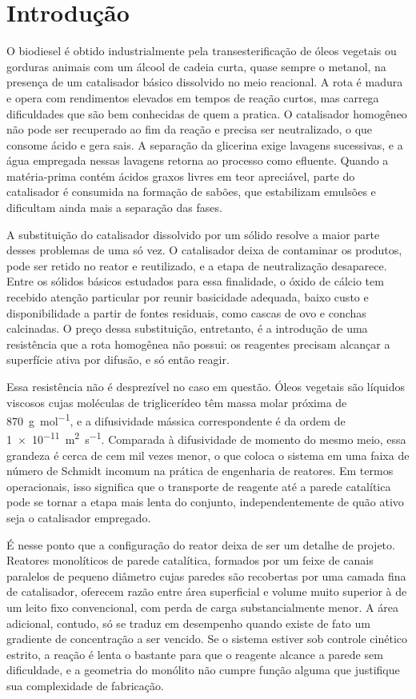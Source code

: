 \chapter*{Introdução}

O biodiesel é obtido industrialmente pela transesterificação de óleos vegetais
ou gorduras animais com um álcool de cadeia curta, quase sempre o metanol, na
presença de um catalisador básico dissolvido no meio reacional. A rota é madura
e opera com rendimentos elevados em tempos de reação curtos, mas carrega
dificuldades que são bem conhecidas de quem a pratica. O catalisador homogêneo
não pode ser recuperado ao fim da reação e precisa ser neutralizado, o que
consome ácido e gera sais. A separação da glicerina exige lavagens sucessivas, e
a água empregada nessas lavagens retorna ao processo como efluente. Quando a
matéria-prima contém ácidos graxos livres em teor apreciável, parte do
catalisador é consumida na formação de sabões, que estabilizam emulsões e
dificultam ainda mais a separação das fases.

A substituição do catalisador dissolvido por um sólido resolve a maior parte
desses problemas de uma só vez. O catalisador deixa de contaminar os produtos,
pode ser retido no reator e reutilizado, e a etapa de neutralização desaparece.
Entre os sólidos básicos estudados para essa finalidade, o óxido de cálcio tem
recebido atenção particular por reunir basicidade adequada, baixo custo e
disponibilidade a partir de fontes residuais, como cascas de ovo e conchas
calcinadas. O preço dessa substituição, entretanto, é a introdução de uma
resistência que a rota homogênea não possui: os reagentes precisam alcançar a
superfície ativa por difusão, e só então reagir.

Essa resistência não é desprezível no caso em questão. Óleos vegetais são
líquidos viscosos cujas moléculas de triglicerídeo têm massa molar próxima de
\SI{870}{\gram\per\mole}, e a difusividade mássica correspondente é da ordem de
\SI{1e-11}{\meter\squared\per\second}. Comparada à difusividade de momento do
mesmo meio, essa grandeza é cerca de cem mil vezes menor, o que coloca o sistema
em uma faixa de número de Schmidt incomum na prática de engenharia de reatores.
Em termos operacionais, isso significa que o transporte de reagente até a parede
catalítica pode se tornar a etapa mais lenta do conjunto, independentemente de
quão ativo seja o catalisador empregado.

É nesse ponto que a configuração do reator deixa de ser um detalhe de projeto.
Reatores monolíticos de parede catalítica, formados por um feixe de canais
paralelos de pequeno diâmetro cujas paredes são recobertas por uma camada fina
de catalisador, oferecem razão entre área superficial e volume muito superior à
de um leito fixo convencional, com perda de carga substancialmente menor. A
área adicional, contudo, só se traduz em desempenho quando existe de fato um
gradiente de concentração a ser vencido. Se o sistema estiver sob controle
cinético estrito, a reação é lenta o bastante para que o reagente alcance a
parede sem dificuldade, e a geometria do monólito não cumpre função alguma que
justifique sua complexidade de fabricação.

